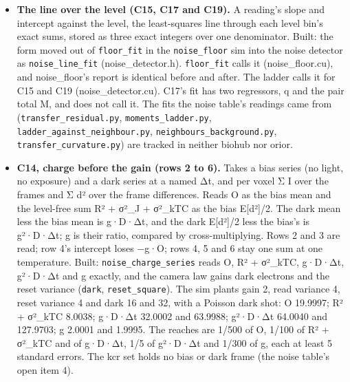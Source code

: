 \begin{enumerate}
\begin{itemize}
\item \textbf{The line over the level (C15, C17 and C19).} A reading's slope and intercept against the level, the least-squares line through each level bin's exact sums, stored as three exact integers over one denominator. Built: the form moved out of \texttt{floor\_\allowbreak{}fit} in the \texttt{noise\_\allowbreak{}floor} sim into the noise detector as \texttt{noise\_\allowbreak{}line\_\allowbreak{}fit} (noise\_\allowbreak{}detector.h). \texttt{floor\_\allowbreak{}fit} calls it (noise\_\allowbreak{}floor.cu), and noise\_\allowbreak{}floor's report is identical before and after. The ladder calls it for C15 and C19 (noise\_\allowbreak{}detector.cu). C17's fit has two regressors, q and the pair total M, and does not call it. The fits the noise table's readings came from (\texttt{transfer\_\allowbreak{}residual.\allowbreak{}py}, \texttt{moments\_\allowbreak{}ladder.\allowbreak{}py}, \texttt{ladder\_\allowbreak{}against\_\allowbreak{}neighbour.\allowbreak{}py}, \texttt{neighbours\_\allowbreak{}background.\allowbreak{}py}, \texttt{transfer\_\allowbreak{}curvature.\allowbreak{}py}) are tracked in neither biohub nor orior.
\item \textbf{C14, charge before the gain (rows 2 to 6).} Takes a bias series (no light, no exposure) and a dark series at a named Δt, and per voxel Σ I over the frames and Σ d² over the frame differences. Reads O as the bias mean and the level-free sum R² + σ²\_\allowbreak{}J + σ²\_\allowbreak{}kTC as the bias E[d²]/2. The dark mean less the bias mean is g·D·Δt, and the dark E[d²]/2 less the bias's is g²·D·Δt; g is their ratio, compared by cross-multiplying. Rows 2 and 3 are read; row 4's intercept loses −g·O; rows 4, 5 and 6 stay one sum at one temperature. Built: \texttt{noise\_\allowbreak{}charge\_\allowbreak{}series} reads O, R² + σ²\_\allowbreak{}kTC, g·D·Δt, g²·D·Δt and g exactly, and the camera law gains dark electrons and the reset variance (\texttt{dark}, \texttt{reset\_\allowbreak{}square}). The sim plants gain 2, read variance 4, reset variance 4 and dark 16 and 32, with a Poisson dark shot: O 19.9997; R² + σ²\_\allowbreak{}kTC 8.0038; g·D·Δt 32.0002 and 63.9988; g²·D·Δt 64.0040 and 127.9703; g 2.0001 and 1.9995. The reaches are 1/500 of O, 1/100 of R² + σ²\_\allowbreak{}kTC and of g·D·Δt, 1/5 of g²·D·Δt and 1/300 of g, each at least 5 standard errors. The kcr set holds no bias or dark frame (the noise table's open item 4).

\end{itemize}
\end{enumerate}
